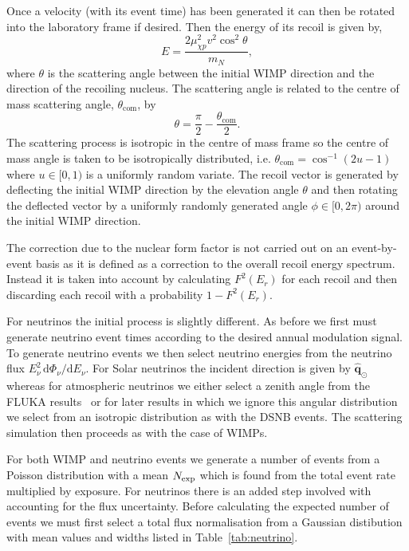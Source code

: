Once a velocity (with its event time) has been generated it can then be rotated into the laboratory frame if desired. Then the energy of its recoil is given by,
\begin{equation}
	E = \frac{2 \mu_{\chi p}^2 v^2 \cos^2\theta}{m_N},
\end{equation}
where $\theta$ is the scattering angle between the initial WIMP direction and the direction of the recoiling nucleus. The scattering angle is related to the centre of mass scattering angle, $\theta_\textrm{com}$, by
\begin{equation}
\theta = \frac{\pi}{2} - \frac{\theta_\textrm{com}}{2}.
\end{equation}
The scattering process is isotropic in the centre of mass frame so the centre of mass angle is taken to be isotropically distributed, i.e. $\theta_\textrm{com}= \cos^{-1} (2u-1)$ where $u \in [0,1)$ is a uniformly random variate. The recoil vector is generated by deflecting the initial WIMP direction by the elevation angle $\theta$ and then rotating the deflected vector by a uniformly randomly generated angle $\phi \in [0,2\pi)$ around the initial WIMP direction.

The correction due to the nuclear form factor is not carried out on an event-by-event basis as it is defined as a correction to the overall recoil energy spectrum. Instead it is taken into account by calculating $F^2(E_r)$ for each recoil and then discarding each recoil with a probability $1-F^2(E_r)$. 

For neutrinos the initial process is slightly different. As before we first must generate neutrino event times according to the desired annual modulation signal. To generate neutrino events we then select neutrino energies from the neutrino flux $E^2_\nu \, \textrm{d}\Phi_\nu/\textrm{d}E_\nu$. For Solar neutrinos the incident direction is given by $\hat{\textbf{q}}_\odot$ whereas for atmospheric neutrinos we either select a zenith angle from the FLUKA results~\cite{Battistoni:2005pd} or for later results in which we ignore this angular distribution we select from an isotropic distribution as with the DSNB events. The scattering simulation then proceeds as with the case of WIMPs. 

For both WIMP and neutrino events we generate a number of events from a Poisson distribution with a mean $N_{\rm exp}$ which is found from the total event rate multiplied by exposure. For neutrinos there is an added step involved with accounting for the flux uncertainty. Before calculating the expected number of events we must first select a total flux normalisation from a Gaussian distibution with mean values and widths listed in Table~\ref{tab:neutrino}. 